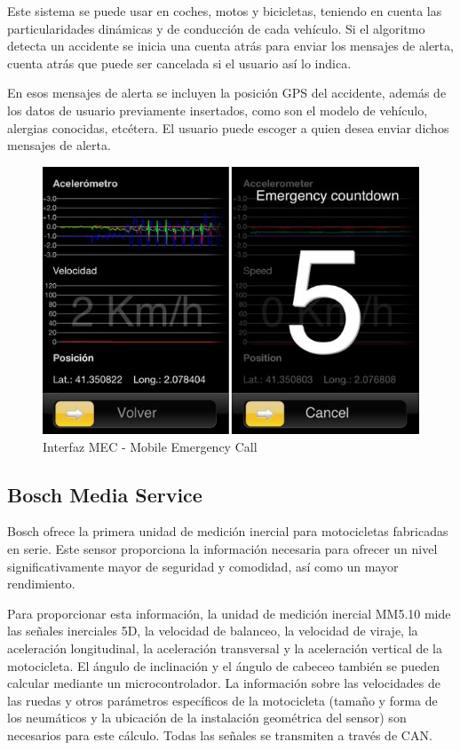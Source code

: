 			Este sistema se puede usar en coches, motos y bicicletas, teniendo en cuenta las particularidades dinámicas y de conducción de cada vehículo. Si el algoritmo detecta un accidente se inicia una cuenta atrás para enviar los mensajes de alerta, cuenta atrás que puede ser cancelada si el usuario así lo indica.
			
			En esos mensajes de alerta se incluyen la posición GPS del accidente, además de los datos de usuario previamente insertados, como son el modelo de vehículo, alergias conocidas, etcétera. El usuario puede escoger a quien desea enviar dichos mensajes de alerta.
			
			\begin{figure}[h]
				\centering
				\includegraphics{imagenes/mec.JPG}
				\caption{Interfaz MEC - Mobile Emergency Call}
				\label{contexto:figura}
			\end{figure}
			
		
		
		\subsection{Bosch Media Service}
		
			Bosch \cite{Bosch} ofrece la primera unidad de medición inercial para motocicletas fabricadas en serie. Este sensor proporciona la información necesaria para ofrecer un nivel significativamente mayor de seguridad y comodidad, así como un mayor rendimiento.
			
			Para proporcionar esta información, la unidad de medición inercial MM5.10 mide las señales inerciales 5D, la velocidad de balanceo, la velocidad de viraje, la aceleración longitudinal, la aceleración transversal y la aceleración vertical de la motocicleta. El ángulo de inclinación y el ángulo de cabeceo también se pueden calcular mediante un microcontrolador. La información sobre las velocidades de las ruedas y otros parámetros específicos de la motocicleta (tamaño y forma de los neumáticos y la ubicación de la instalación geométrica del sensor) son necesarios para este cálculo. Todas las señales se transmiten a través de CAN.
			
